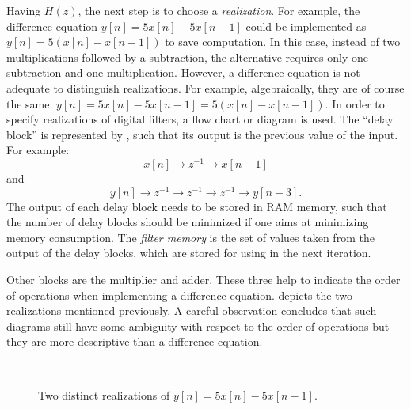 Having $H(z)$, the next step is to choose a \emph{realization}. For example, the difference equation $y[n] = 5x[n] - 5x[n-1]$ could be implemented as $y[n] = 5 (x[n] - x[n-1])$ to save computation. In this case, instead of two multiplications followed by a subtraction, the alternative requires only one subtraction and one multiplication. However, a difference equation is not adequate to distinguish realizations. For example, algebraically, they are of course the same: $y[n] = 5 x[n] - 5x[n-1] = 5 (x[n] - x[n-1])$. In order to specify realizations of digital filters, a flow chart or diagram is used. The ``delay block'' is represented by , such that its output is the previous value of the input. For example:
\[
x[n] \rightarrow\boxed{z^{-1}}\rightarrow x[n-1]
\]
and
\[
y[n] \rightarrow\boxed{z^{-1}}\rightarrow \boxed{z^{-1}} \rightarrow \boxed{z^{-1}} \rightarrow y[n-3].
\]
The output of each delay block needs to be stored in RAM memory, such that the number of delay blocks should be minimized if one aims at minimizing memory consumption. The \emph{filter memory} is the set of values taken from the output of the delay blocks, which are stored for using in the next iteration.

Other blocks are the multiplier and adder. These three help to indicate the order of operations when implementing a difference equation.  depicts the two realizations mentioned previously. A careful observation concludes that such diagrams still have some ambiguity with respect to the order of operations but they are more descriptive than a difference equation.

\begin{figure}
\centering
\textrm{~~~~~~}    
  \caption{Two distinct realizations of $y[n]=5x[n] - 5x[n-1]$.}
  \label{fig:fir_realizations}
\end{figure}

